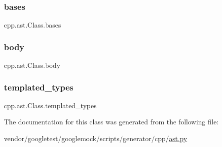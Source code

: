 \subsubsection{\texorpdfstring{bases}{bases}}
{\footnotesize\ttfamily cpp.\+ast.\+Class.\+bases}

\mbox{\label{classcpp_1_1ast_1_1_class_add39f61fdcf6dae42d79cac3dcbb7782}} 
\subsubsection{\texorpdfstring{body}{body}}
{\footnotesize\ttfamily cpp.\+ast.\+Class.\+body}

\mbox{\label{classcpp_1_1ast_1_1_class_a48ed0d3115656554d9134bc1787390fa}} 
\subsubsection{\texorpdfstring{templated\+\_\+types}{templated\_types}}
{\footnotesize\ttfamily cpp.\+ast.\+Class.\+templated\+\_\+types}



The documentation for this class was generated from the following file\+:\begin{DoxyCompactItemize}
\item 
vendor/googletest/googlemock/scripts/generator/cpp/\hyperlink{ast_8py}{ast.\+py}\end{DoxyCompactItemize}
